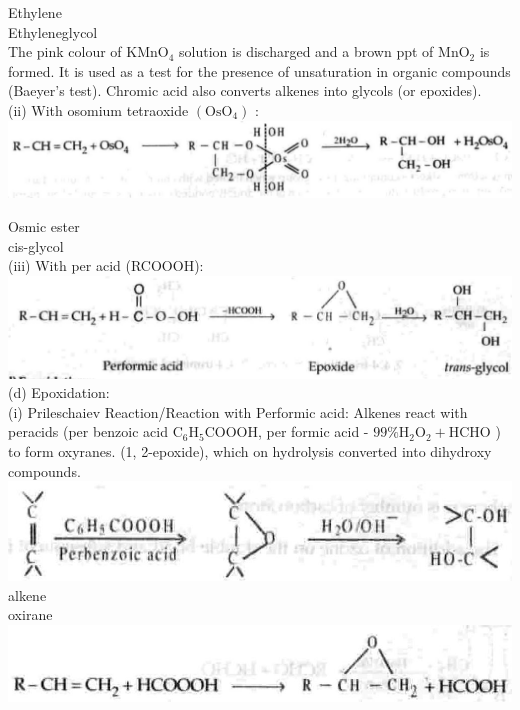 \documentclass[10pt]{article}
\begin{document}
Ethylene\\
Ethyleneglycol\\
The pink colour of $\mathrm{KMnO}_{4}$ solution is discharged and a brown ppt of $\mathrm{MnO}_{2}$ is formed. It is used as a test for the presence of unsaturation in organic compounds (Baeyer's test). Chromic acid also converts alkenes into glycols (or epoxides).\\
(ii) With osomium tetraoxide $\left(\mathrm{OsO}_{4}\right)$ :\\
\includegraphics[max width=\textwidth, center]{2025_01_28_8470952b98110cec3aabg-183(4)}

Osmic ester\\
cis-glycol\\
(iii) With per acid (RCOOOH):\\
\includegraphics[max width=\textwidth, center]{2025_01_28_8470952b98110cec3aabg-184(3)}\\
(d) Epoxidation:\\
(i) Prileschaiev Reaction/Reaction with Performic acid: Alkenes react with peracids (per benzoic acid $\mathrm{C}_{6} \mathrm{H}_{5} \mathrm{COOOH}$, per formic acid - $99 \% \mathrm{H}_{2} \mathrm{O}_{2}+\mathrm{HCHO}$ ) to form oxyranes. (1, 2-epoxide), which on hydrolysis converted into dihydroxy compounds.\\
\includegraphics[max width=\textwidth, center]{2025_01_28_8470952b98110cec3aabg-184(4)}\\
alkene\\
oxirane\\
\includegraphics[max width=\textwidth, center]{2025_01_28_8470952b98110cec3aabg-184(2)}
\end{document}
